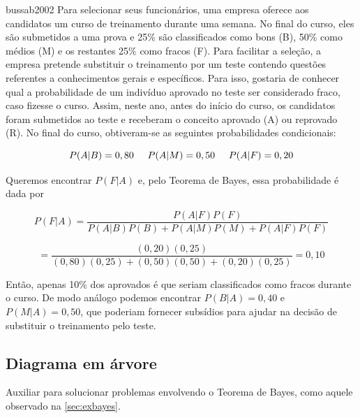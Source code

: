 \documentclass[a4paper]{article}
\begin{document}
	\begin{displaycquote}[p. 118]{bussab2002}
		Para selecionar seus funcionários, uma empresa oferece aos candidatos um curso de treinamento durante uma semana. No final do curso, eles são submetidos a uma prova e 25\% são classificados como bons (B), 50\% como médios (M) e os restantes 25\% como fracos (F). Para facilitar a seleção, a empresa pretende substituir o treinamento por um teste contendo questões referentes a conhecimentos gerais e específicos. Para isso, gostaria de conhecer qual a probabilidade de um indivíduo aprovado no teste ser considerado fraco, caso fizesse o curso. Assim, neste ano, antes do início do curso, os candidatos foram submetidos ao teste e receberam o conceito aprovado (A) ou reprovado (R). No final do curso, obtiveram-se as seguintes probabilidades condicionais:
		
		\begin{equation*}
		P(A|B) = 0,80 \hspace{5mm} P(A|M) = 0,50 \hspace{5mm} P(A|F) = 0,20
		\end{equation*}
		
		Queremos encontrar $P(F | A)$ e, pelo Teorema de Bayes, essa probabilidade é dada por
		
		\begin{equation*}
			P(F|A) = \dfrac{P(A|F)P(F)}{P(A|B)P(B) + P(A|M)P(M) + P(A|F)P(F)}
		\end{equation*}
		
		\begin{equation*}
			= \dfrac{(0,20)(0,25)}{(0,80)(0,25)+(0,50)(0,50)+(0,20)(0,25)} = 0,10
		\end{equation*}
		
		Então, apenas 10\% dos aprovados é que seriam classificados como fracos durante o
		curso. De modo análogo podemos encontrar $P(B | A) = 0,40$ e $P(M | A) = 0,50$, que poderiam fornecer subsídios para ajudar na decisão de substituir o treinamento pelo teste.
	\end{displaycquote}

	\subsection{Diagrama em árvore}
	
	Auxiliar para solucionar  problemas envolvendo o Teorema de Bayes, como aquele observado na \autoref{sec:exbayes}.
	
\end{document}
